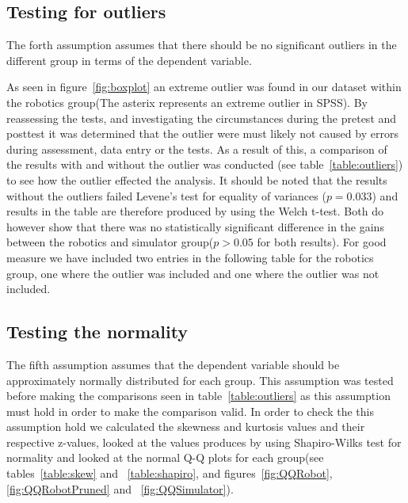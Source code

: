 \subsection{Testing for outliers}\label{sec:outliers}
The forth assumption assumes that there should be no significant outliers in the different group in terms of the dependent variable. 


\bigskip\noindent
As seen in figure~\ref{fig:boxplot} an extreme outlier was found in our dataset within the robotics group(The asterix represents an extreme outlier in SPSS). 
By reassessing the tests, and investigating the circumstances during the pretest and posttest it was determined that the outlier were must likely not caused by errors during assessment, data entry or the tests. 
As a result of this, a comparison of the results with and without the outlier was conducted (see table~\ref{table:outliers}) to see how the outlier effected the analysis. 
It should be noted that the results without the outliers failed Levene's test for equality of variances ($p = 0.033$) and results in the table are therefore produced by using the Welch t-test. 
Both do however show that there was no statistically significant difference in the gains between the robotics and simulator group($p > 0.05$ for both results).
For good measure we have included two entries in the following table for the robotics group, one where the outlier was included and one where the outlier was not included.


\bigskip\noindent
{}

\subsection{Testing the normality}\label{sec:normality}
The fifth assumption assumes that the dependent variable should be approximately normally distributed for each group. This assumption was tested before making the comparisons seen in table~\ref{table:outliers} as this assumption must hold in order to make the comparison valid. 
In order to check the this assumption hold we calculated the skewness and kurtosis values and their respective z-values, looked at the values produces by using Shapiro-Wilks test for normality and looked at the normal Q-Q plots for each group(see tables~\ref{table:skew} and ~\ref{table:shapiro}, and figures~\ref{fig:QQRobot},\ref{fig:QQRobotPruned} and ~\ref{fig:QQSimulator}).

